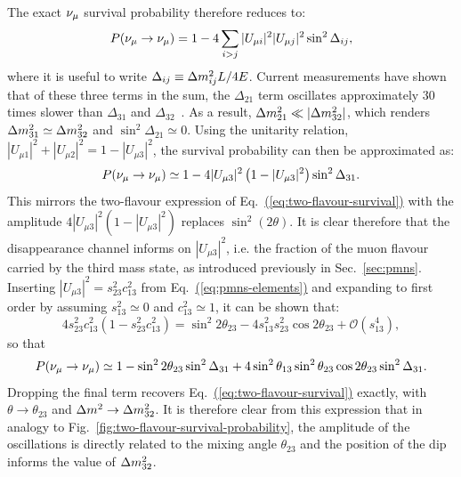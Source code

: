 The exact $\nu_\mu$ survival probability therefore reduces to:
\begin{equation}
    P(\nu_\mu \to \nu_\mu) = 1 - 4\sum_{i>j}|U_{\mu i}|^{2}|U_{\mu j}|^{2}\sin^{2}\Delta_{ij},
    \label{eq:pmumu-exact}
\end{equation}
where it is useful to write $\Delta_{ij} \equiv \Delta m^{2}_{ij}L/4E$. Current measurements have shown that of these three
terms in the sum, the $\Delta_{21}$ term oscillates approximately $30$ times slower
than $\Delta_{31}$ and $\Delta_{32}$~\cite{NunokawaParkeValle2008,PDG2024}. As a result,
$\Delta m^{2}_{21} \ll |\Delta m^{2}_{32}|$, which renders $\Delta m^{2}_{31} \simeq \Delta m^{2}_{32}$ and
$\sin^{2}{\Delta_{21}} \simeq 0$. Using the unitarity relation, $|U_{\mu 1}|^{2} + |U_{\mu 2}|^{2} = 1 - |U_{\mu 3}|^{2}$, the survival probability can then be approximated as:
\begin{equation}
    P(\nu_\mu \to \nu_\mu) \simeq 1 - 4|U_{\mu 3}|^{2}\left(1 - |U_{\mu 3}|^{2}\right)\sin^{2}\Delta_{31}.
    \label{eq:pmumu-effective}
\end{equation}
This mirrors the two-flavour expression of Eq.~\hyperref[eq:two-flavour-survival]{(\ref{eq:two-flavour-survival})} with the amplitude $4|U_{\mu3}|^{2}(1-|U_{\mu3}|^{2})$ replaces $\sin^{2}(2\theta)$. It is clear therefore that the disappearance channel informs on $|U_{\mu 3}|^{2}$, i.e. the fraction of the muon flavour carried by the third mass state, as introduced previously in Sec.~\ref{sec:pmns}.
Inserting $|U_{\mu 3}|^{2} = s_{23}^{2}c_{13}^{2}$ from Eq.~\hyperref[eq:pmns-elements]{(\ref{eq:pmns-elements})} and expanding to first order by assuming $s_{13}^{2} \simeq 0$ and $c_{13}^{2} \simeq 1$, it can be shown that:
\begin{equation}
    4s_{23}^{2}c_{13}^{2}\left(1 - s_{23}^{2}c_{13}^{2}\right)
    = \sin^{2}2\theta_{23} - 4s_{13}^{2}s_{23}^{2}\cos 2\theta_{23} + \mathcal{O}(s_{13}^{4}),
    \label{eq:amplitude-expansion}
\end{equation}
so that
\begin{equation}
    P(\nu_\mu \to \nu_\mu) \simeq
    1 - \sin^{2}2\theta_{23}\sin^{2}\Delta_{31}
    + 4\sin^{2}\theta_{13}\sin^{2}\theta_{23}\cos 2\theta_{23}\sin^{2}\Delta_{31}.
    \label{eq:pmumu-expanded}
\end{equation}
Dropping the final term recovers Eq.~\hyperref[eq:two-flavour-survival]{(\ref{eq:two-flavour-survival})} exactly, with $\theta \to \theta_{23}$ and $\Delta m^{2}_{} \to \Delta m^{2}_{32}$.
It is therefore clear from this expression that in analogy to Fig.~\ref{fig:two-flavour-survival-probability}, the amplitude of the oscillations is directly related to the mixing angle $\theta_{23}$ and the position of the dip informs the value of $\Delta m^{2}_{32}$.

